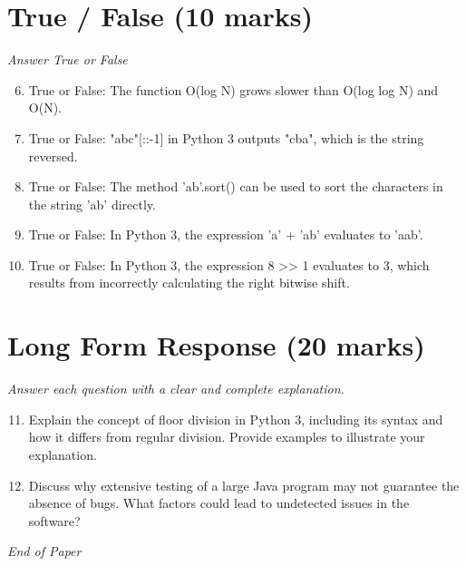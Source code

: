\documentclass[12pt]{article}
\begin{document}
\section*{True / False (10 marks)}
\textit{Answer True or False}
\begin{enumerate}[label=\arabic*.]
\setcounter{enumi}{5}
\item True or False: The function O(log N) grows slower than O(log log N) and O(N).
\item True or False: "abc"[::-1] in Python 3 outputs "cba", which is the string reversed.
\item True or False: The method 'ab'.sort() can be used to sort the characters in the string 'ab' directly.
\item True or False: In Python 3, the expression 'a' + 'ab' evaluates to 'aab'.
\item True or False: In Python 3, the expression 8 \textgreater{}\textgreater{} 1 evaluates to 3, which results from incorrectly calculating the right bitwise shift.
\end{enumerate}

\section*{Long Form Response (20 marks)}
\textit{Answer each question with a clear and complete explanation.}
\begin{enumerate}[label=\arabic*.]
\setcounter{enumi}{10}
\item Explain the concept of floor division in Python 3, including its syntax and how it differs from regular division. Provide examples to illustrate your explanation.
\item Discuss why extensive testing of a large Java program may not guarantee the absence of bugs. What factors could lead to undetected issues in the software?
\end{enumerate}

\vfill
\noindent\textit{End of Paper}
\end{document}
